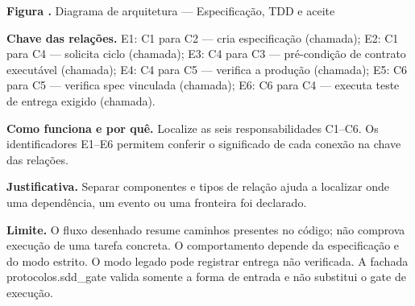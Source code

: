 {\small\textbf{Figura \thefigure.} Diagrama de arquitetura --- Especificação, TDD e aceite}\par\smallskip
{\footnotesize\textbf{Chave das relações.} E1: C1 para C2 --- cria especificação (chamada); E2: C1 para C4 --- solicita ciclo (chamada); E3: C4 para C3 --- pré-condição de contrato executável (chamada); E4: C4 para C5 --- verifica a produção (chamada); E5: C6 para C5 --- verifica spec vinculada (chamada); E6: C6 para C4 --- executa teste de entrega exigido (chamada).}\par\smallskip
\noindent\textbf{Como funciona e por quê.} Localize as seis responsabilidades C1--C6. Os identificadores E1--E6 permitem conferir o significado de cada conexão na chave das relações.\par
\noindent\textbf{Justificativa.} Separar componentes e tipos de relação ajuda a localizar onde uma dependência, um evento ou uma fronteira foi declarado.\par
\noindent\textbf{Limite.} O fluxo desenhado resume caminhos presentes no código; não comprova execução de uma tarefa concreta. O comportamento depende da especificação e do modo estrito. O modo legado pode registrar entrega não verificada. A fachada protocolos.sdd\_gate valida somente a forma de entrada e não substitui o gate de execução.\par\smallskip
{}
